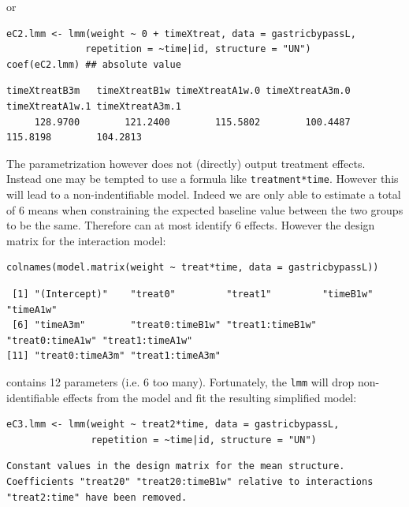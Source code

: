 \documentclass[12pt]{article}
\begin{document}
or
\lstset{language=r,label= ,caption= ,captionpos=b,numbers=none}
\begin{lstlisting}
eC2.lmm <- lmm(weight ~ 0 + timeXtreat, data = gastricbypassL,
              repetition = ~time|id, structure = "UN")
coef(eC2.lmm) ## absolute value
\end{lstlisting}

\begin{verbatim}
timeXtreatB3m   timeXtreatB1w timeXtreatA1w.0 timeXtreatA3m.0 timeXtreatA1w.1 timeXtreatA3m.1 
     128.9700        121.2400        115.5802        100.4487        115.8198        104.2813
\end{verbatim}


The parametrization however does not (directly) output treatment
effects. Instead one may be tempted to use a formula like
\texttt{treatment*time}. However this will lead to a non-indentifiable
model. Indeed we are only able to estimate a total of 6 means when
constraining the expected baseline value between the two groups to be
the same. Therefore can at most identify 6 effects. However the design
matrix for the interaction model:
\lstset{language=r,label= ,caption= ,captionpos=b,numbers=none}
\begin{lstlisting}
colnames(model.matrix(weight ~ treat*time, data = gastricbypassL))
\end{lstlisting}

\begin{verbatim}
 [1] "(Intercept)"    "treat0"         "treat1"         "timeB1w"        "timeA1w"       
 [6] "timeA3m"        "treat0:timeB1w" "treat1:timeB1w" "treat0:timeA1w" "treat1:timeA1w"
[11] "treat0:timeA3m" "treat1:timeA3m"
\end{verbatim}


contains 12 parameters (i.e. 6 too many). Fortunately, the \texttt{lmm} will
 drop non-identifiable effects from the model and fit the resulting
 simplified model:
\lstset{language=r,label= ,caption= ,captionpos=b,numbers=none}
\begin{lstlisting}
eC3.lmm <- lmm(weight ~ treat2*time, data = gastricbypassL,
               repetition = ~time|id, structure = "UN")
\end{lstlisting}

\begin{verbatim}
Constant values in the design matrix for the mean structure.
Coefficients "treat20" "treat20:timeB1w" relative to interactions "treat2:time" have been removed.
\end{verbatim}
\end{document}
